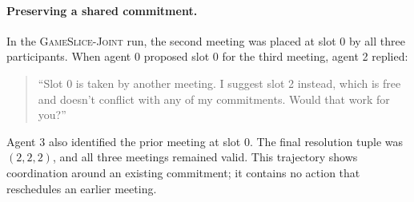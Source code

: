 \paragraph{Preserving a shared commitment.}
In the \textsc{GameSlice-Joint} run, the second meeting was placed at slot 0
by all three participants. When agent 0 proposed slot 0 for the third
meeting, agent 2 replied:
\begin{quote}\small
``Slot 0 is taken by another meeting. I suggest slot 2 instead, which is free
and doesn't conflict with any of my commitments. Would that work for you?''
\end{quote}
Agent 3 also identified the prior meeting at slot 0. The final resolution
tuple was $(2,2,2)$, and all three meetings remained valid. This trajectory
shows coordination around an existing commitment; it contains no action that
reschedules an earlier meeting.
